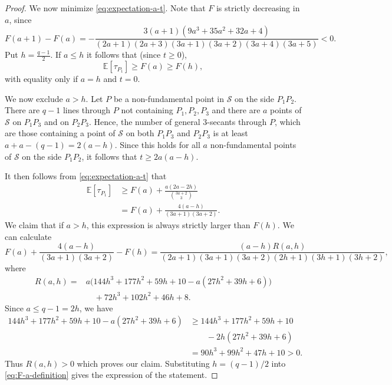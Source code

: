 \documentclass{article}
\begin{document}
\begin{proof}
We now minimize \eqref{eq:expectation-a-t}.  Note that $F$ is
strictly decreasing in $a$, since
\begin{equation}
\label{eq:F-decreasing}
F(a+1)-F(a)
=-\frac{3(a+1)(9a^3+35a^2+32a+4)}
{(2a+1)(2a+3)(3a+1)(3a+2)(3a+4)(3a+5)}<0.
\end{equation}
Put $h=\frac{q-1}{2}$.  If $a\leq h$ it follows that (since $t\geq 0$),
\[
\mathbb E[\tau_{P_1}]\geq F(a)\geq F(h),
\]
with equality only if $a=h$ and $t=0$.

 

We now exclude $a>h$.  Let $P$ be a non-fundamental point in $\mathcal{S}$ on the side $P_1P_2$. There are $q-1$ lines through $P$ not containing $P_1,P_2,P_3$ and there are $a$ points of $\mathcal{S}$ on $P_1P_3$ and on $P_2P_3$. Hence, the number of general $3$-secants through $P$, which are those containing a point of $\mathcal{S}$ on both $P_1P_3$ and $P_2P_3$ is at least $a+a-(q-1)=2(a-h)$. Since this holds for all $a$ non-fundamental points of $\mathcal{S}$ on the side $P_1P_2$, it follows that $t\geq 2a(a-h).$


It then follows from \eqref{eq:expectation-a-t} that
\begin{align*}
\mathbb E[\tau_{P_1}]
&\geq F(a)+\frac{a(2a-2h)}{\binom{3a+2}{3}}\\
&=F(a)+\frac{4(a-h)}{(3a+1)(3a+2)}.
\end{align*}
We claim that if $a>h$, this expression is always strictly larger than $F(h)$.  We can calculate
\begin{equation}
\label{eq:large-a-difference}
F(a)+\frac{4(a-h)}{(3a+1)(3a+2)}-F(h)
=\frac{(a-h)R(a,h)}
{(2a+1)(3a+1)(3a+2)(2h+1)(3h+1)(3h+2)},
\end{equation}
where
\begin{align*}
R(a,h)={}&a\bigl(144h^3+177h^2+59h+10
                 -a(27h^2+39h+6)\bigr)\\
&\quad+72h^3+102h^2+46h+8.
\end{align*}
Since $a\leq q-1=2h$, we have
\begin{align*}
144h^3+177h^2+59h+10-a(27h^2+39h+6)
&\geq 144h^3+177h^2+59h+10\\
&\qquad-2h(27h^2+39h+6)\\
&=90h^3+99h^2+47h+10>0.
\end{align*}
Thus $R(a,h)>0$ which proves our claim.
Substituting $h=(q-1)/2$ into \eqref{eq:F-a-definition} gives the expression of the statement.


\end{proof}
\end{document}
